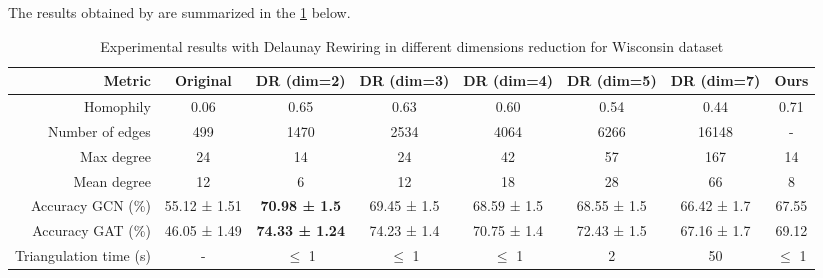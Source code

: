 \documentclass{article}
\theoremstyle{plain}
\theoremstyle{definition}
\theoremstyle{remark}
\begin{document}
The results obtained by \cite{attali2024delaunay} are summarized in the \cref{tab:wisconsin} below.
\begin{table}[h!]
\caption{Experimental results with Delaunay Rewiring in different dimensions reduction for Wisconsin dataset}
\centering
\begin{tabular}{rccccccc}
\hline
\textbf{Metric}            & \textbf{Original} & \textbf{DR (dim=2)} & \textbf{DR (dim=3)} & \textbf{DR (dim=4)} & \textbf{DR (dim=5)} & \textbf{DR (dim=7)} & \textbf{Ours} \\ \hline
Homophily                  & 0.06                   & 0.65                & 0.63                & 0.60                & 0.54                & 0.44             & 0.71   \\ 
Number of edges            & 499                    & 1470                & 2534                & 4064                & 6266                & 16148             & -  \\ 
Max degree                 & 24                     & 14                  & 24                  & 42                  & 57                  & 167               &  14 \\ 
Mean degree                & 12                     & 6                   & 12                  & 18                  & 28                  & 66                & 8  \\ 
Accuracy GCN (\%)          & 55.12 ± 1.51           & \textbf{70.98 ± 1.5}         & 69.45 ± 1.5         & 68.59 ± 1.5         & 68.55 ± 1.5         & 66.42 ± 1.7   & 67.55      \\ 
Accuracy GAT (\%)          & 46.05 ± 1.49           & \textbf{74.33 ± 1.24}        & 74.23 ± 1.4         & 70.75 ± 1.4         & 72.43 ± 1.5         & 67.16 ± 1.7    & 69.12     \\ 
Triangulation time (s) & -                      & $\leq$ 1                 & $\leq$ 1                 & $\leq$ 1           & 2                   & 50               &$\leq$ 1    \\ \hline
\end{tabular}
\label{tab:wisconsin}
\end{table}


\end{document}
